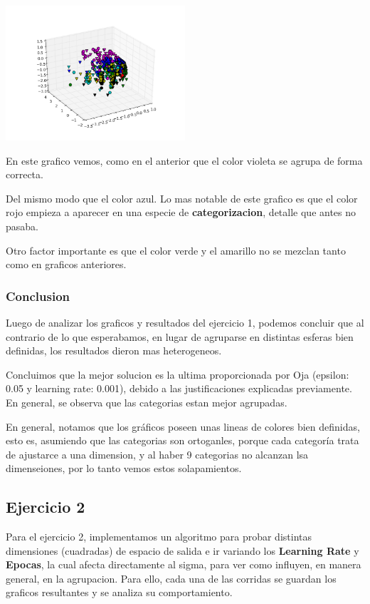 \includegraphics[width=0.5\textwidth]{img/ej1_oja_005_240}

En este grafico vemos, como en el anterior que el color violeta se agrupa de forma correcta.

Del mismo modo que el color azul. Lo mas notable de este grafico es que el color rojo empieza a aparecer en una especie de \textbf{categorizacion}, detalle que antes no pasaba. 

Otro factor importante es que el color verde y el amarillo no se mezclan tanto como en graficos anteriores.

\subsubsection{Conclusion}

Luego de analizar los graficos y resultados del ejercicio 1, podemos concluir que al contrario de lo que esperabamos, en lugar de agruparse en distintas esferas bien definidas, los resultados dieron mas heterogeneos.

Concluimos que la mejor solucion es la ultima proporcionada por Oja (epsilon: 0.05 y learning rate: 0.001), debido a las justificaciones explicadas previamente. En general, se observa que las categorias estan mejor agrupadas.

En general, notamos que los gr\'aficos poseen unas lineas de colores bien definidas, esto es, asumiendo que las categorias son ortoganles, porque cada categor\'ia trata de ajustarce a una dimension, y al haber 9 categorias no alcanzan lsa dimenseiones, por lo tanto vemos estos solapamientos.

\subsection{Ejercicio 2}

Para el ejercicio 2, implementamos un algoritmo para probar distintas dimensiones (cuadradas) de espacio de salida e ir variando los \textbf{Learning Rate} y \textbf{Epocas}, la cual afecta directamente al sigma, para ver como influyen, en manera general, en la agrupacion. Para ello, cada una de las corridas se guardan los graficos resultantes y se analiza su comportamiento.

